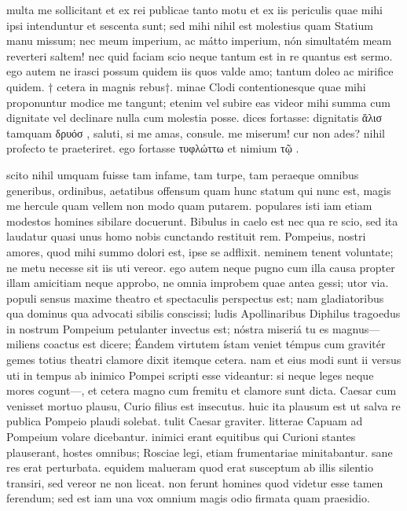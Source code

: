 


 multa me sollicitant et ex rei publicae tanto motu et ex iis periculis quae mihi ipsi intenduntur et sescenta sunt; sed mihi nihil est molestius quam Statium manu missum; nec meum imperium, ac mátto imperium, nón simultatém meam reverteri saltem! nec quid faciam scio neque tantum est in re quantus est sermo. ego autem ne irasci possum quidem iis quos valde amo; tantum doleo ac mirifice quidem. † cetera in magnis rebus†. minae Clodi contentionesque quae mihi proponuntur modice me tangunt; etenim vel subire eas videor mihi summa cum dignitate vel declinare nulla cum molestia posse. dices fortasse: dignitatis ἅλισ tamquam δρυόσ , saluti, si me amas, consule. me miserum! cur non ades? nihil profecto te praeteriret. ego fortasse τυφλώττω et nimium τῷ .

 scito nihil umquam fuisse tam infame, tam turpe, tam peraeque omnibus generibus, ordinibus, aetatibus offensum quam hunc statum qui nunc est, magis me hercule quam vellem non modo quam putarem. populares isti iam etiam modestos homines sibilare docuerunt. Bibulus in caelo est nec qua re scio, sed ita laudatur quasi unus homo nobis cunctando restituit rem. Pompeius, nostri amores, quod mihi summo dolori est, ipse se adflixit. neminem tenent voluntate; ne metu necesse sit iis uti vereor. ego autem neque pugno cum illa causa propter illam amicitiam neque approbo, ne omnia improbem quae antea gessi; utor via. populi sensus maxime theatro et spectaculis perspectus est; nam gladiatoribus qua dominus qua advocati sibilis conscissi; ludis Apollinaribus Diphilus tragoedus in nostrum Pompeium petulanter invectus est; nóstra miseriá tu es magnus— miliens coactus est dicere; Éandem virtutem ístam veniet témpus cum gravitér gemes totius theatri clamore dixit itemque cetera. nam et eius modi sunt ii versus uti in tempus ab inimico Pompei scripti esse videantur: si neque leges neque mores cogunt—, et cetera magno cum fremitu et clamore sunt dicta. Caesar cum venisset mortuo plausu, Curio filius est insecutus. huic ita plausum est ut salva re publica Pompeio plaudi solebat. tulit Caesar graviter. litterae Capuam ad Pompeium volare dicebantur. inimici erant equitibus qui Curioni stantes plauserant, hostes omnibus; Rosciae legi, etiam frumentariae minitabantur. sane res erat perturbata. equidem malueram quod erat susceptum ab illis silentio transiri, sed vereor ne non liceat. non ferunt homines quod videtur esse tamen ferendum; sed est iam una vox omnium magis odio firmata quam praesidio.

